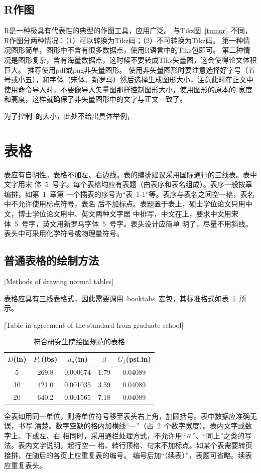 \subsection{R作图}
R是一种极具有代表性的典型的作图工具，应用广泛。
与Tikz图~\ref{tumor}~不同，R作图分两种情况：（1）可以转换为Tikz码；（2）不可转换为Tikz码。
第一种情况图形简单，图形中不含有很多数据点，使用R语言中的Tikz包即可。
第二种情况是图形复杂，含有海量数据点，这时候不要转成Tikz矢量图，这会使得论文体积巨大。
推荐使用pdf或png非矢量图形。
使用非矢量图形时要注意选择好字号（五号或小五），和字体（宋体、新罗马）然后选择生成图形大小，注意此时在正文中使用命令导入时，不要像导入矢量图那样控制图形大小，使用图形的原本的
宽度和高度，这样就确保了非矢量图形中的文字与正文一致了。

为了控制\hithesis\ 的大小，此处不给出具体举例，

\section{表格}

表应有自明性。表格不加左、右边线。表的编排建议采用国际通行的三线表。表中文字用宋
体~5~号字。每个表格均应有表题（由表序和表名组成）。表序一般按章编排，如第~1~章第
一个插表的序号为“表~1-1”等。表序与表名之间空一格，表名中不允许使用标点符号，表名
后不加标点。表题置于表上，硕士学位论文只用中文，博士学位论文用中、英文两种文字居
中排写，中文在上，要求中文用宋体~5~号字，英文用新罗马字体~5~号字。表头设计应简单
明了，尽量不用斜线。表头中可采用化学符号或物理量符号。


\subsection{普通表格的绘制方法}[Methods of drawing normal tables]

表格应具有三线表格式，因此需要调用~booktabs~宏包，其标准格式如表~\ref{table1}~所示。
\begin{table}[htbp]
\caption{符合研究生院绘图规范的表格}[Table in agreement of the standard from graduate school]\label{table1}
\centering\wuhao
\begin{tabular}{ccccc}
\toprule
$D$(in) & $P_u$(lbs) & $u_u$(in) & $\beta$ & $G_f$(psi.in)\\
\midrule
 5 & 269.8 & 0.000674 & 1.79 & 0.04089\\
10 & 421.0 & 0.001035 & 3.59 & 0.04089\\
20 & 640.2 & 0.001565 & 7.18 & 0.04089\\
\bottomrule
\end{tabular}
\end{table}
全表如用同一单位，则将单位符号移至表头右上角，加圆括号。表中数据应准确无误，书写
清楚。数字空缺的格内加横线“－”（占~2~个数字宽度）。表内文字或数字上、下或左、右
相同时，采用通栏处理方式，不允许用“〃”、“同上”之类的写法。表内文字说明，起行空一
格、转行顶格、句末不加标点。如某个表需要转页接排，在随后的各页上应重复表的编号。
编号后加“（续表）”，表题可省略。续表应重复表头。

